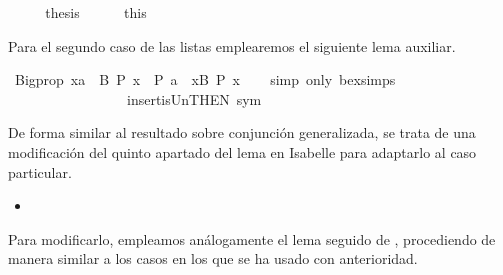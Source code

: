 \begin{isabellebody}
\ \ \isamarkupfalse%
\ \isamarkupfalse%
\ {\isacharquery}thesis\isanewline
\ \ \ \ \isamarkupfalse%
\ this\isanewline
{}\isamarkupfalse%
%
\endisatagproof
{\isafoldproof}%
%
\isadelimproof
%
\endisadelimproof
%
\begin{isamarkuptext}%
Para el segundo caso de las listas emplearemos el siguiente lema
  auxiliar.%
\end{isamarkuptext}\isamarkuptrue%
\isamarkupfalse%
\ Bigprop{}{\isacharcolon}\ {\isachardoublequoteopen}{\isacharparenleft}{\isasymexists}x{\isasymin}{\isacharbraceleft}a{\isacharbraceright}\ {\isasymunion}\ B{\isachardot}\ P\ x{\isacharparenright}\ {\isacharequal}\ {\isacharparenleft}P\ a\ {\isasymor}\ {\isacharparenleft}{\isasymexists}x{\isasymin}B{\isachardot}\ P\ x{\isacharparenright}{\isacharparenright}{\isachardoublequoteclose}\isanewline
%
\isadelimproof
\ \ %
\endisadelimproof
%
\isatagproof
{}\isamarkupfalse%
\ {\isacharparenleft}simp\ only{\isacharcolon}\ bex{\isacharunderscore}simps{\isacharparenleft}{}{\isacharparenright}\isanewline
\ \ \ \ \ \ \ \ \ \ \ \ \ \ \ \ \ insert{\isacharunderscore}is{\isacharunderscore}Un{\isacharbrackleft}THEN\ sym{\isacharbrackright}{\isacharparenright}%
\endisatagproof
{\isafoldproof}%
%
\isadelimproof
%
\endisadelimproof
%
\begin{isamarkuptext}%
De forma similar al resultado sobre conjunción generalizada, se 
  trata de una modificación del quinto apartado del lema  en 
  Isabelle para adaptarlo al caso particular. 

  \begin{itemize}
    \item[]  
        \hspace{3cm} 
  \end{itemize}
  
  Para modificarlo, empleamos análogamente el lema 
  seguido de , procediendo de manera similar a los casos 
  en los que se ha usado con anterioridad.
  

\end{isamarkuptext}
\end{isabellebody}
